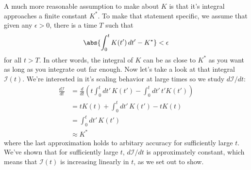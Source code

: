 A much more reasonable assumption to make about $K$ is that it's integral approaches a finite constant $K^*$.
To make that statement specific, we assume that given any $\epsilon > 0$, there is a time $T$ such that
\begin{equation*}
  \abs{\int_0^t K(t') \, dt' - K^*} < \epsilon
\end{equation*}
for all $t > T$.
In other words, the integral of $K$ can be as close to $K^*$ as you want as long as you integrate out far enough.
Now let's take a look at that integral $\mathcal{I}(t)$.
We're interested in it's scaling behavior at large times so we study $d\mathcal{I}/dt$:
\begin{align*}
	\frac{d\mathcal{I}}{dt}
	&= \frac{d}{dt}
	\left(
		t \int_0^t dt' \, K(t') - \int_0^t dt' \, t' K(t')
	\right) \\
	&= t K(t) + \int_0^t dt' \, K(t') - t K(t) \\
	&= \int_0^t dt' \, K(t') \\
	&\approx K^*
\end{align*}
where the last approximation holds to arbitary accuracy for sufficiently large $t$.
We've shown that for sufficiently large $t$, $d\mathcal{I}/dt$ is approximately constant, which means that $\mathcal{I}(t)$ is increasing linearly in $t$, as we set out to show.


